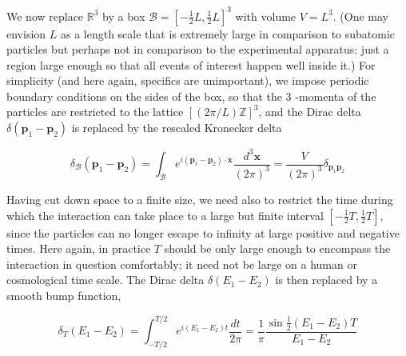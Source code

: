 \documentclass[10pt, letterpaper]{article}
\begin{document}
We now replace $\mathbb{R}^{3}$ by a box $\mathcal{B}=\left[-\frac{1}{2} L, \frac{1}{2} L\right]^{3}$ with volume $V=L^{3}$. (One may envision $L$ as a length scale that is extremely large in comparison to subatomic particles but perhaps not in comparison to the experimental apparatus: just a region large enough so that all events of interest happen well inside it.) For simplicity (and here again, specifics are unimportant), we impose periodic boundary conditions on the sides of the box, so that the 3 -momenta of the particles are restricted to the lattice $[(2 \pi / L) \mathbb{Z}]^{3}$, and the Dirac delta $\delta\left(\mathbf{p}_{1}-\mathbf{p}_{2}\right)$ is replaced by the rescaled Kronecker delta

$$
\delta_{\mathcal{B}}\left(\mathbf{p}_{1}-\mathbf{p}_{2}\right)=\int_{\mathcal{B}} e^{i\left(\mathbf{p}_{1}-\mathbf{p}_{2}\right) \cdot \mathbf{x}} \frac{d^{3} \mathbf{x}}{(2 \pi)^{3}}=\frac{V}{(2 \pi)^{3}} \delta_{\mathbf{p}_{1} \mathbf{p}_{2}}
$$

Having cut down space to a finite size, we need also to restrict the time during which the interaction can take place to a large but finite interval $\left[-\frac{1}{2} T, \frac{1}{2} T\right]$, since the particles can no longer escape to infinity at large positive and negative times. Here again, in practice $T$ should be only large enough to encompass the interaction in question comfortably; it need not be large on a human or cosmological time scale. The Dirac delta $\delta\left(E_{1}-E_{2}\right)$ is then replaced by a smooth bump function,

$$
\delta_{T}\left(E_{1}-E_{2}\right)=\int_{-T / 2}^{T / 2} e^{i\left(E_{1}-E_{2}\right) t} \frac{d t}{2 \pi}=\frac{1}{\pi} \frac{\sin \frac{1}{2}\left(E_{1}-E_{2}\right) T}{E_{1}-E_{2}}
$$
\end{document}
